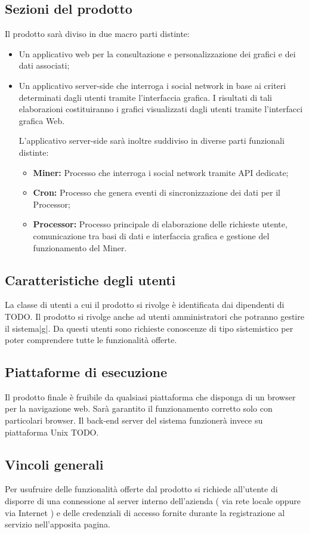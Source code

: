 \subsection{Sezioni del prodotto}
Il prodotto sarà diviso in due macro parti distinte:

\begin{itemize}
\item Un applicativo web per la consultazione e personalizzazione dei grafici e dei dati associati;
\item Un applicativo server-side che interroga i social network in base ai criteri determinati dagli utenti tramite l'interfaccia grafica. I risultati di tali elaborazioni costituiranno i grafici visualizzati dagli utenti tramite l'interfacci grafica Web.

L'applicativo server-side sarà inoltre suddiviso in diverse parti funzionali distinte:
\begin{itemize}
\item \textbf{Miner:} Processo che interroga i social network tramite API dedicate;
\item \textbf{Cron:} Processo che genera eventi di sincronizzazione dei dati per il Processor;
\item \textbf{Processor:} Processo principale di elaborazione delle richieste utente, comunicazione tra basi di dati e interfaccia grafica e gestione del funzionamento del Miner.
\end{itemize}

\end{itemize}

\subsection{Caratteristiche degli utenti}
La classe di utenti a cui il prodotto si rivolge è identificata dai dipendenti di TODO. 
Il prodotto si rivolge anche ad utenti amministratori che potranno gestire il sistema|g|.
Da questi utenti sono richieste conoscenze di tipo sistemistico per poter comprendere tutte le funzionalità offerte.

\subsection{Piattaforme di esecuzione}
Il prodotto finale è fruibile da qualsiasi piattaforma che disponga di un browser per la navigazione web. Sarà garantito il funzionamento corretto solo con particolari browser.
Il back-end server del sistema funzionerà invece su piattaforma Unix TODO.

\subsection{Vincoli generali}
Per usufruire delle funzionalità offerte dal prodotto si richiede all'utente di disporre
di una connessione al server interno dell'azienda ( via rete locale oppure via Internet ) e delle credenziali di accesso fornite durante la registrazione al servizio nell'apposita pagina.
